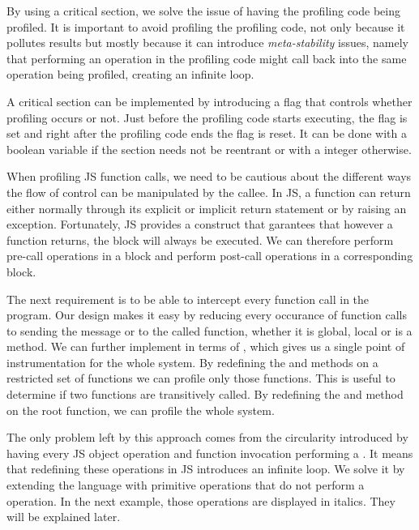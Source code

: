 By using a critical section, we solve the issue of having the profiling code
being profiled. It is important to avoid profiling the profiling code, not only
because it pollutes results but mostly because it can introduce
\textit{meta-stability} issues, namely that performing an operation in the
profiling code might call back into the same operation being profiled, creating
an infinite loop.

A critical section can be implemented by introducing a flag that controls
whether profiling occurs or not. Just before the profiling code starts
executing, the flag is set and right after the profiling code ends the flag is
reset. It can be done with a boolean variable if the section needs not be
reentrant or with a integer otherwise.

When profiling JS function calls, we need to be cautious about the different
ways the flow of control can be manipulated by the callee. In JS, a function
can return either normally through its explicit or implicit return statement or
by raising an exception. Fortunately, JS provides a  construct that
garantees that however a function returns, the  block will always
be executed. We can therefore perform pre-call operations in a  block
and perform post-call operations in a corresponding  block.

The next requirement is to be able to intercept every function call in the
program. Our design makes it easy by reducing every occurance of function calls
to sending the message  or  to the called function, whether
it is global, local or is a method. We can further implement  in terms
of , which gives us a single point of instrumentation for the whole
system. By redefining the  and  methods on a restricted set
of functions we can profile only those functions. This is useful to determine
if two functions are transitively called.  By redefining the  and
 method on the root function, we can profile the whole system.

The only problem left by this approach comes from the circularity introduced by
having every JS object operation and function invocation performing a
. It means that redefining these operations in JS introduces an
infinite loop. We solve it by extending the language with primitive operations
that do not perform a  operation. In the next example, those
operations are displayed in italics. They will be explained later.

